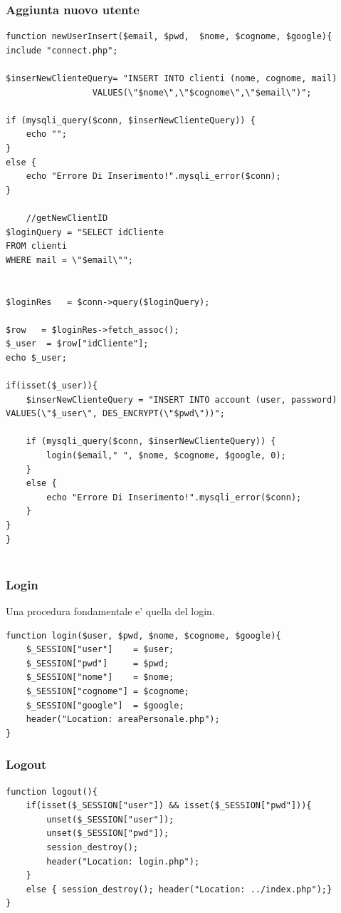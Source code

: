 \documentclass[a4paper, 12pt]{report}
\begin{document}
\subsubsection{Aggiunta nuovo utente}
\begin{lstlisting}[caption=\textit{newUserInsert()}]
function newUserInsert($email, $pwd,  $nome, $cognome, $google){
include "connect.php";

$inserNewClienteQuery= "INSERT INTO clienti (nome, cognome, mail)
                 VALUES(\"$nome\",\"$cognome\",\"$email\")";
    
if (mysqli_query($conn, $inserNewClienteQuery)) {
    echo "";
}
else {
    echo "Errore Di Inserimento!".mysqli_error($conn);
}

    //getNewClientID
$loginQuery = "SELECT idCliente
FROM clienti
WHERE mail = \"$email\"";


$loginRes   = $conn->query($loginQuery);

$row   = $loginRes->fetch_assoc();
$_user  = $row["idCliente"];
echo $_user;

if(isset($_user)){ 
    $inserNewClienteQuery = "INSERT INTO account (user, password)
VALUES(\"$_user\", DES_ENCRYPT(\"$pwd\"))";

    if (mysqli_query($conn, $inserNewClienteQuery)) {
        login($email," ", $nome, $cognome, $google, 0);
    }
    else {
        echo "Errore Di Inserimento!".mysqli_error($conn);
    }
}       
}
                
\end{lstlisting}
\newpage
\subsubsection{Login}
Una procedura fondamentale e' quella del login.
\begin{lstlisting}[caption=\textit{login()}]
function login($user, $pwd, $nome, $cognome, $google){
    $_SESSION["user"]    = $user;
    $_SESSION["pwd"]     = $pwd;
    $_SESSION["nome"]    = $nome;
    $_SESSION["cognome"] = $cognome;
    $_SESSION["google"]  = $google;
    header("Location: areaPersonale.php");
}
\end{lstlisting}
\subsubsection{Logout}
\begin{lstlisting}[caption=\textit{login()}]
function logout(){
    if(isset($_SESSION["user"]) && isset($_SESSION["pwd"])){
        unset($_SESSION["user"]);
        unset($_SESSION["pwd"]);
        session_destroy();
        header("Location: login.php");
    }
    else { session_destroy(); header("Location: ../index.php");}
}
\end{lstlisting}
\end{document}
